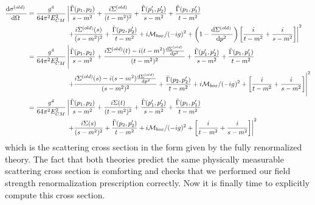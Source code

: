 \documentclass{article}
\begin{document}
\begin{align*}
\frac{\mathrm{d}\sigma^{(old)} \:}{\mathrm{d}\Omega \:} &= \frac{g^4}{64 \pi^2 E_{CM}^2} \left|  \frac{ \tilde{\Gamma}(p_1, p_2)}{s  - m^2} + \frac{i \Sigma^{(old)}}{(t - m^2)^2} + \frac{\tilde{\Gamma}(p_1', p_2')}{s - m^2} 
+  \frac{\tilde{\Gamma}(p_1, p_1')}{t - m^2} \right.
\\ 
& \left.
\quad \quad \quad \quad \quad \quad 
+ \frac{i \Sigma^{(old)}(s)}{(s - m^2)^2} + \frac{\tilde{\Gamma}(p_2, p_2')}{t - m^2} + i\mathcal{M}_{box}/(-ig)^2 + \left( 1 - \frac{\mathrm{d}\Sigma^{(old)} \:}{\mathrm{d}p^2 \:} \right) \left[\frac{i}{t - m^2 } + \frac{i}{s - m^2 }\right] \right|^2  
\\
&= \frac{g^4}{64 \pi^2 E_{CM}^2} \left|  \frac{ \tilde{\Gamma}(p_1, p_2)}{s  - m^2} + \frac{i \Sigma^{(old)}(t) - i(t - m^2) \frac{\mathrm{d}\Sigma^{(old)} \:}{\mathrm{d}p^2 \:}}{(t - m^2)^2} + \frac{\tilde{\Gamma}(p_1', p_2')}{s - m^2} 
+  \frac{\tilde{\Gamma}(p_1, p_1')}{t - m^2} \right.
\\ 
& \left.
\quad \quad \quad \quad \quad \quad 
+ \frac{i \Sigma^{(old)}(s) - i(s - m^2) \frac{\mathrm{d}\Sigma^{(old)} \:}{\mathrm{d}p^2 \:} }{(s - m^2)^2} + \frac{\tilde{\Gamma}(p_2, p_2')}{t - m^2} + i\mathcal{M}_{box}/(-ig)^2 + \left[\frac{i}{t - m^2 } + \frac{i}{s - m^2 }\right] \right|^2
\\
&= \frac{g^4}{64 \pi^2 E_{CM}^2} \left|  \frac{ \tilde{\Gamma}(p_1, p_2)}{s  - m^2} + \frac{i \Sigma(t)}{(t - m^2)^2} + \frac{\tilde{\Gamma}(p_1', p_2')}{s - m^2} 
+  \frac{\tilde{\Gamma}(p_1, p_1')}{t - m^2} \right.
\\ 
& \left.
\quad \quad \quad \quad \quad \quad 
+ \frac{i \Sigma(s)}{(s - m^2)^2} + \frac{\tilde{\Gamma}(p_2, p_2')}{t - m^2} + i\mathcal{M}_{box}/(-ig)^2 + \left[\frac{i}{t - m^2 } + \frac{i}{s - m^2 }\right] \right|^2    
\end{align*}  
which is the scattering cross section in the form given by the fully renormalized theory. The fact that both theories predict the same physically measurable scattering cross section is comforting and checks that we performed our field strength renormalization prescription correctly. Now it is finally time to explicitly compute this cross section.
\end{document}
